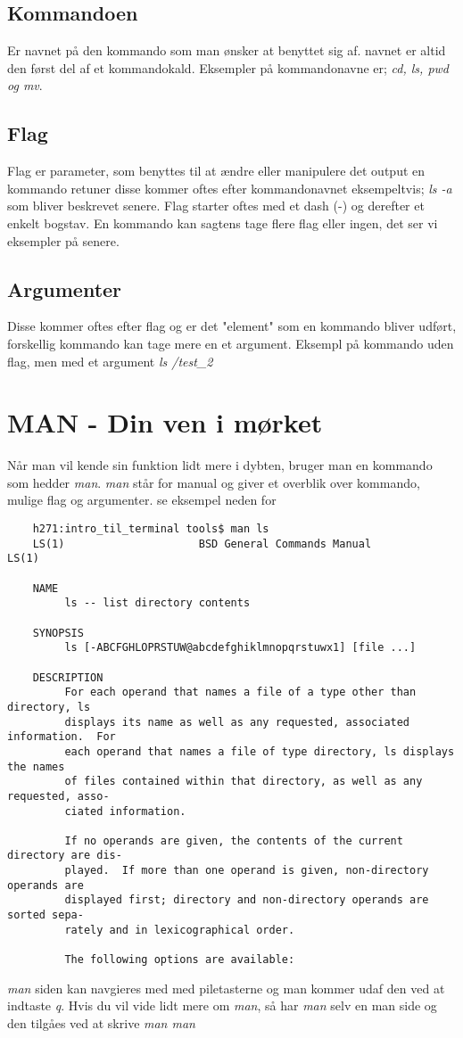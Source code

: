 \subsection*{Kommandoen}
Er navnet på den kommando som man ønsker at benyttet sig af. navnet er altid den først del af et kommandokald. Eksempler på 
kommandonavne er; \textit{cd, ls, pwd og mv}.
\subsection*{Flag}
Flag er parameter, som benyttes til at ændre eller manipulere det output en kommando retuner disse kommer oftes efter kommandonavnet eksempeltvis; \textit{ls -a} som bliver beskrevet senere. Flag starter oftes med et dash (-) og derefter et enkelt bogstav. En kommando kan sagtens tage flere flag eller ingen, det ser vi eksempler på senere.
\subsection*{Argumenter}
Disse kommer oftes efter flag og er det "element" som en kommando bliver udført, forskellig kommando kan tage mere en et argument. Eksempl på kommando uden flag, men med et argument \textit{ls /test\_2}
\section{MAN - Din ven i mørket}
Når man vil kende sin funktion lidt mere i dybten, bruger man en kommando som hedder \textit{man}. \textit{man} står for manual og giver et overblik over kommando, mulige flag og argumenter. se eksempel neden for
\begin{lstlisting}
	h271:intro_til_terminal tools$ man ls
	LS(1)                     BSD General Commands Manual                    LS(1)

	NAME
	     ls -- list directory contents

	SYNOPSIS
	     ls [-ABCFGHLOPRSTUW@abcdefghiklmnopqrstuwx1] [file ...]

	DESCRIPTION
	     For each operand that names a file of a type other than directory, ls
	     displays its name as well as any requested, associated information.  For
	     each operand that names a file of type directory, ls displays the names
	     of files contained within that directory, as well as any requested, asso-
	     ciated information.

	     If no operands are given, the contents of the current directory are dis-
	     played.  If more than one operand is given, non-directory operands are
	     displayed first; directory and non-directory operands are sorted sepa-
	     rately and in lexicographical order.

	     The following options are available:
\end{lstlisting}
\textit{man} siden kan navgieres med med piletasterne og man kommer udaf den ved at indtaste \textit{q}. Hvis du vil vide lidt mere om \textit{man}, så har \textit{man} selv en man side og den tilgåes ved at skrive \textit{man man}
